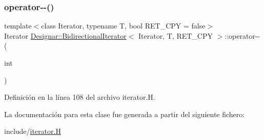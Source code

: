 \subsubsection{\texorpdfstring{operator-\/-\/()}{operator--()}\hspace{0.1cm}{\footnotesize\ttfamily [2/2]}}
{\footnotesize\ttfamily template$<$class Iterator, typename T, bool R\+E\+T\+\_\+\+C\+PY = false$>$ \\
Iterator \hyperlink{class_designar_1_1_bidirectional_iterator}{Designar\+::\+Bidirectional\+Iterator}$<$ Iterator, T, R\+E\+T\+\_\+\+C\+PY $>$\+::operator-\/-\/ (\begin{DoxyParamCaption}\item[{int}]{ }\end{DoxyParamCaption})\hspace{0.3cm}{\ttfamily [inline]}}



Definición en la línea 108 del archivo iterator.\+H.



La documentación para esta clase fue generada a partir del siguiente fichero\+:\begin{DoxyCompactItemize}
\item 
include/\hyperlink{iterator_8_h}{iterator.\+H}\end{DoxyCompactItemize}
